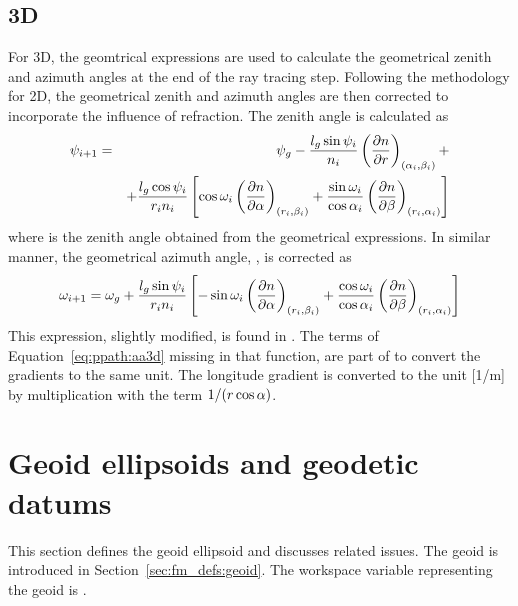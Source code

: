 \subsection{3D}
\label{sec:ppath:refr3D}
For 3D, the geomtrical expressions are used to
calculate the geometrical zenith and azimuth angles at the end of the
ray tracing step. Following the methodology for 2D, the geometrical
zenith and azimuth angles are then corrected to incorporate the
influence of refraction. The zenith angle is calculated as
\begin{eqnarray}
  \psi_{i+1} &=& \psi_{g} - \frac{l_g\sin\psi_{i}}{n_i} 
     \left( \frac{\partial n}{\partial r} \right)_{(\alpha_{i},\beta_{i})} + \\
     & &  + \frac{l_g\cos\psi_{i}}{r_{i}n_i}
   \left[
     \cos\omega_{i} 
          \left( \frac{\partial n}{\partial \alpha} \right)_{(r_{i},\beta_{i})}
    +\frac{\sin\omega_{i}}{\cos\alpha_{i}} 
          \left( \frac{\partial n}{\partial \beta} \right)_{(r_{i},\alpha_{i})}
  \right]  \nonumber
  \label{eq:ppath:za3d} 
\end{eqnarray}
where  is the zenith angle obtained from the geometrical
expressions. In similar manner, the geometrical azimuth angle,
, is corrected as
\begin{equation}
  \omega_{i+1} = \omega_{g} + \frac{l_g\sin\psi_{i}}{r_in_i} 
   \left[
    -\sin\omega_{i} 
          \left( \frac{\partial n}{\partial \alpha} \right)_{(r_{i},\beta_{i})}
    +\frac{\cos\omega_{i}}{\cos\alpha_{i}}
          \left( \frac{\partial n}{\partial \beta} \right)_{(r_{i},\alpha_{i})}
  \right]  
  \label{eq:ppath:aa3d} 
\end{equation}
This expression, slightly modified, is found in
. The terms of
Equation~\ref{eq:ppath:aa3d} missing in that function, are part of
 to convert the gradients to the same
unit. The longitude gradient is converted to the unit [1/m] by
multiplication with the term $1/(r\cos\alpha)$.




\section{Geoid ellipsoids and geodetic datums}
\label{sec:ppath:geoids}

This section defines the geoid ellipsoid and discusses related
issues. The geoid is introduced in Section~\ref{sec:fm_defs:geoid}.
The workspace variable representing the geoid is .


